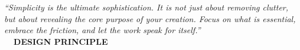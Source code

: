 \documentclass[12pt]{article}
\begin{document}
\begin{center}
  \begin{minipage}{0.85\textwidth}
    \centering
    \vspace{0.2cm}
    {\color{primary}\fontsize{18}{24}\selectfont\itshape 
      ``Simplicity is the ultimate sophistication. It is not just about removing clutter, but about revealing the core purpose of your creation. Focus on what is essential, embrace the friction, and let the work speak for itself.''
    } \\[1em]
    {\color{accent}\bfseries\large\faPen\ \ DESIGN PRINCIPLE}
    \vspace{0.2cm}
  \end{minipage}
\end{center}

\vspace{0.8cm}
\end{document}
